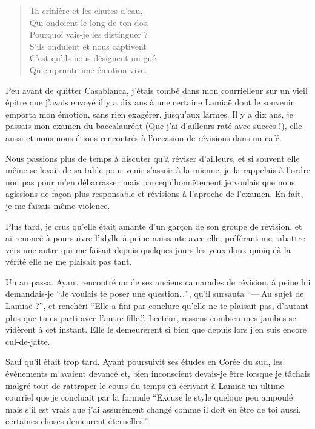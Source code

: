 \begin{verse}\sizain
  Ta crinière et les chutes d’eau,\\ 
  Qui ondoient le long de ton dos,\\ 
  Pourquoi vais-je les distinguer ?\\ 
  S’ils ondulent et nous captivent\\ 
  C’est qu’ils nous désignent un gué\\ 
  Qu’emprunte une émotion vive.  %
\end{verse}

\begin{prose}
  Peu avant de quitter Casablanca, j’étais tombé dans mon courrielleur sur un vieil épitre que j’avais envoyé il y a dix ans à une certaine Lamiaë dont le souvenir emporta mon émotion, sans rien exagérer, jusqu’aux larmes. Il y a dix ans, je passais mon examen du baccalauréat (Que j’ai d’ailleurs raté avec succès !), elle aussi et nous nous étions rencontrés à l’occasion de révisions dans un café.

  Nous passions plus de temps à discuter qu’à réviser d’ailleurs, et si souvent elle même se levait de sa table pour venir s’assoir à la mienne, je la rappelais à l’ordre non pas pour m’en débarrasser mais parcequ’honnêtement je voulais que nous agissions de façon plus responsable et révisions à l’aproche de l’examen. En fait, je me faisais même violence.

  Plus tard, je crus qu’elle était amante d’un garçon de son groupe de révision, et ai renoncé à poursuivre l’idylle à peine naissante avec elle, préférant me rabattre vers une autre qui me faisait depuis quelques jours les yeux doux quoiqu’à la vérité elle ne me plaisait pas tant.

  Un an passa. Ayant rencontré un de ses anciens camarades de révision, à peine lui demandais-je \enquote{Je voulais te poser une question…}, qu’il sursauta \enquote{—\,Au sujet de Lamiaë ?}, et renchéri \enquote{Elle a fini par conclure qu’elle ne te plaisait pas, d’autant plus que tu es parti avec l’autre fille.}. Lecteur, ressens combien mes jambes se vidèrent à cet instant. Elle le demeurèrent si bien que depuis lors j’en suis encore cul-de-jatte.

  Sauf qu’il était trop tard. Ayant poursuivit ses études en Corée du sud, les évènements m’avaient devancé et, bien inconscient devais-je être lorsque je tâchais malgré tout de rattraper le cours du temps  en écrivant à Lamiaë un ultime courriel que je concluait par la formule \enquote{Excuse le style quelque peu ampoulé mais s’il est vrais que j’ai assurément changé comme il doit en être de toi aussi, certaines choses demeurent éternelles.}.
\end{prose}

